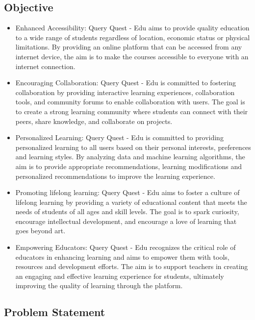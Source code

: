 \subsection{Objective}
\begin{itemize}
\item Enhanced Accessibility: Query Quest - Edu aims to provide quality education to a wide range of students regardless of location, economic status or physical limitations. By providing an online platform that can be accessed from any internet device, the aim is to make the courses accessible to everyone with an internet connection.

\item Encouraging Collaboration: Query Quest - Edu is committed to fostering collaboration by providing interactive learning experiences, collaboration tools, and community forums to enable collaboration with users. The goal is to create a strong learning community where students can connect with their peers, share knowledge, and collaborate on projects.

\item Personalized Learning: Query Quest - Edu is committed to providing personalized learning to all users based on their personal interests, preferences and learning styles. By analyzing data and machine learning algorithms, the aim is to provide appropriate recommendations, learning modifications and personalized recommendations to improve the learning experience.

\item Promoting lifelong learning: Query Quest - Edu aims to foster a culture of lifelong learning by providing a variety of educational content that meets the needs of students of all ages and skill levels. The goal is to spark curiosity, encourage intellectual development, and encourage a love of learning that goes beyond art.

\item Empowering Educators: Query Quest - Edu recognizes the critical role of educators in enhancing learning and aims to empower them with tools, resources and development efforts. The aim is to support teachers in creating an engaging and effective learning experience for students, ultimately improving the quality of learning through the platform.
   
\end{itemize} 
\newpage
\subsection{Problem Statement }

